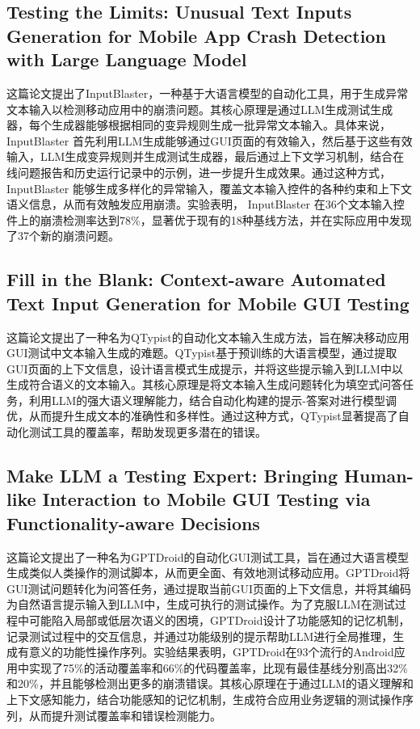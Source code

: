 \documentclass[UTF8, fontset=windows]{article}
\begin{document}
\subsection{Testing the Limits: Unusual Text Inputs Generation for Mobile App Crash Detection with Large Language Model}

这篇论文提出了InputBlaster，一种基于大语言模型的自动化工具，用于生成异常文本输入以检测移动应用中的崩溃问题。其核心原理是通过LLM生成测试生成器，每个生成器能够根据相同的变异规则生成一批异常文本输入。具体来说， InputBlaster 首先利用LLM生成能够通过GUI页面的有效输入，然后基于这些有效输入，LLM生成变异规则并生成测试生成器，最后通过上下文学习机制，结合在线问题报告和历史运行记录中的示例，进一步提升生成效果。通过这种方式， InputBlaster 能够生成多样化的异常输入，覆盖文本输入控件的各种约束和上下文语义信息，从而有效触发应用崩溃。实验表明， InputBlaster 在36个文本输入控件上的崩溃检测率达到78\%，显著优于现有的18种基线方法，并在实际应用中发现了37个新的崩溃问题。

\subsection{Fill in the Blank: Context-aware Automated Text Input Generation for Mobile GUI Testing}

这篇论文提出了一种名为QTypist的自动化文本输入生成方法，旨在解决移动应用GUI测试中文本输入生成的难题。QTypist基于预训练的大语言模型，通过提取GUI页面的上下文信息，设计语言模式生成提示，并将这些提示输入到LLM中以生成符合语义的文本输入。其核心原理是将文本输入生成问题转化为填空式问答任务，利用LLM的强大语义理解能力，结合自动化构建的提示-答案对进行模型调优，从而提升生成文本的准确性和多样性。通过这种方式，QTypist显著提高了自动化测试工具的覆盖率，帮助发现更多潜在的错误。

\subsection{Make LLM a Testing Expert: Bringing Human-like Interaction to Mobile GUI Testing via Functionality-aware Decisions}

这篇论文提出了一种名为GPTDroid的自动化GUI测试工具，旨在通过大语言模型生成类似人类操作的测试脚本，从而更全面、有效地测试移动应用。GPTDroid将GUI测试问题转化为问答任务，通过提取当前GUI页面的上下文信息，并将其编码为自然语言提示输入到LLM中，生成可执行的测试操作。为了克服LLM在测试过程中可能陷入局部或低层次语义的困境，GPTDroid设计了功能感知的记忆机制，记录测试过程中的交互信息，并通过功能级别的提示帮助LLM进行全局推理，生成有意义的功能性操作序列。实验结果表明，GPTDroid在93个流行的Android应用中实现了75\%的活动覆盖率和66\%的代码覆盖率，比现有最佳基线分别高出32\%和20\%，并且能够检测出更多的崩溃错误。其核心原理在于通过LLM的语义理解和上下文感知能力，结合功能感知的记忆机制，生成符合应用业务逻辑的测试操作序列，从而提升测试覆盖率和错误检测能力。
\end{document}
